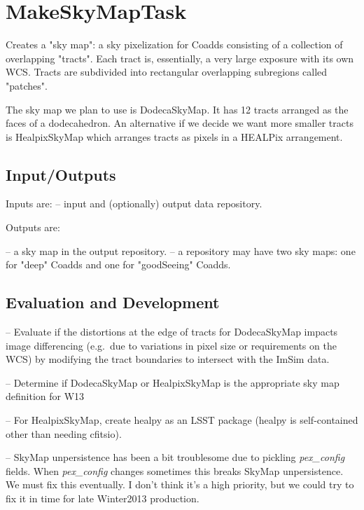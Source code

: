 \documentclass[prd, nofootinbib, floatfix, 11pt,tightenlines,times]{article}
\begin{document}

\section{MakeSkyMapTask} 

Creates a "sky map": a sky pixelization for Coadds consisting of a
collection of overlapping "tracts".  Each tract is, essentially, a
very large exposure with its own WCS.  Tracts are subdivided into
rectangular overlapping subregions called "patches".

The sky map we plan to use is DodecaSkyMap. It has 12 tracts arranged
as the faces of a dodecahedron.  An alternative if we decide we want
more smaller tracts is HealpixSkyMap which arranges tracts as pixels
in a HEALPix arrangement.

\subsection{Input/Outputs}
 Inputs are:
--  input and (optionally) output data repository.

Outputs are:

-- a sky map in the output repository.
-- a repository may have two sky maps: one for "deep" Coadds and one for "goodSeeing" Coadds.

\subsection{Evaluation and Development}

-- Evaluate if the distortions at the edge of tracts for DodecaSkyMap
impacts image differencing (e.g.\ due to variations in pixel size or
requirements on the WCS) by modifying the tract boundaries to
intersect with the ImSim data. 

-- Determine if DodecaSkyMap or HealpixSkyMap is the appropriate sky
map definition for W13

-- For HealpixSkyMap, create healpy as an LSST package (healpy is
self-contained other than needing cfitsio).

-- SkyMap unpersistence has been a bit troublesome due to pickling {\it pex\_config} fields.
When {\it pex\_config} changes sometimes this breaks SkyMap unpersistence. We must fix this eventually.
I don't think it's a high priority, but we could try to fix it in time
for late Winter2013 production.

\end{document}

